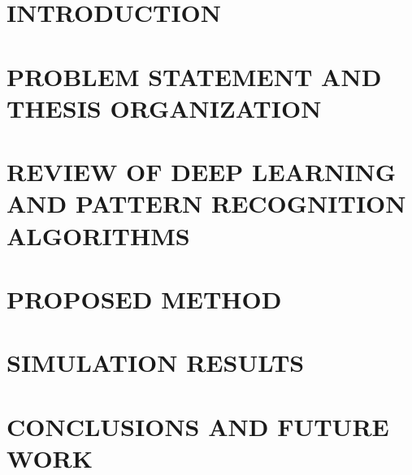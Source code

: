 \documentclass[12pt,epsfig,times]{report}
\begin{document}
\chapter{INTRODUCTION}\label{ch1}


\chapter{PROBLEM STATEMENT AND THESIS ORGANIZATION}\label{ch2}


\chapter{REVIEW OF DEEP LEARNING AND PATTERN RECOGNITION ALGORITHMS}\label{ch3}


\chapter{PROPOSED METHOD}\label{ch4}


\chapter{SIMULATION RESULTS}\label{ch5}


\chapter{CONCLUSIONS AND FUTURE WORK}\label{ch6}

%
\begin{thebibliography}{9}

\end{thebibliography}
\end{document}
